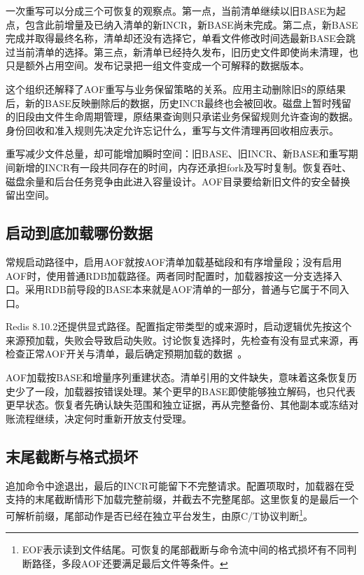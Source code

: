 一次重写可以分成三个可恢复的观察点。第一点，当前清单继续以旧BASE为起点，包含此前增量及已纳入清单的新INCR，新BASE尚未完成。第二点，新BASE完成并取得最终名称，清单却还没有选择它，单看文件修改时间选最新BASE会跳过当前清单的选择。第三点，新清单已经持久发布，旧历史文件即使尚未清理，也只是额外占用空间。发布记录把一组文件变成一个可解释的数据版本。


这个组织还解释了AOF重写与业务保留策略的关系。应用主动删除旧S的原结果后，新的BASE反映删除后的数据，历史INCR最终也会被回收。磁盘上暂时残留的旧段由文件生命周期管理，原结果查询则只承诺业务保留规则允许查询的数据。身份回收和准入规则先决定允许忘记什么，重写与文件清理再回收相应表示。

重写减少文件总量，却可能增加瞬时空间：旧BASE、旧INCR、新BASE和重写期间新增的INCR有一段共同存在的时间，内存还承担fork及写时复制。恢复吞吐、磁盘余量和后台任务竞争由此进入容量设计。AOF目录要给新旧文件的安全替换留出空间。

\subsection{启动到底加载哪份数据}

常规启动路径中，启用AOF就按AOF清单加载基础段和有序增量段；没有启用AOF时，使用普通RDB加载路径。两者同时配置时，加载器按这一分支选择入口。采用RDB前导段的BASE本来就是AOF清单的一部分，普通与它属于不同入口。

Redis 8.10.2还提供显式路径。配置指定带类型的或来源时，启动逻辑优先按这个来源预加载，失败会导致启动失败。讨论恢复选择时，先检查有没有显式来源，再检查正常AOF开关与清单，最后确定预期加载的数据~\cite{redis8102-source}。


AOF加载按BASE和增量序列重建状态。清单引用的文件缺失，意味着这条恢复历史少了一段，加载器按错误处理。某个更早的BASE即使能够独立解码，也只代表更早状态。恢复者先确认缺失范围和独立证据，再从完整备份、其他副本或冻结对账流程继续，决定何时重新开放支付受理。

\subsection{末尾截断与格式损坏}

追加命令中途退出，最后的INCR可能留下不完整请求。配置项取时，加载器在受支持的末尾截断情形下加载完整前缀，并截去不完整尾部。这里恢复的是最后一个可解析前缀，尾部动作是否已经在独立平台发生，由原C/T协议判断\footnote{EOF表示读到文件结尾。可恢复的尾部截断与命令流中间的格式损坏有不同判断路径，多段AOF还要满足最后文件等条件。}。

